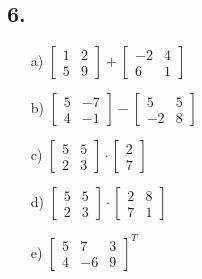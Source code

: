 \documentclass{article}
\begin{document}
\subsection*{6.}
\begin{itemize}
    \item[a) ]	
    			$ 
    			\begin{bmatrix}
    			1 & 2 \\
    			5 & 9
    			\end{bmatrix}
    			+
    			\begin{bmatrix}
    			-2 & 4 \\
    			6  & 1
    			\end{bmatrix}
    			$
    \item[b) ]	
    			$ 
    			\begin{bmatrix}
    			5 & -7 \\
    			4 & -1
    			\end{bmatrix}
    			-
    			\begin{bmatrix}
    			5   & 5 \\
    			-2  & 8
    			\end{bmatrix}
    			$
    			
    \item[c) ]	
    			$ 
    			\begin{bmatrix}
    			5  & 5 \\
    			2  & 3
    			\end{bmatrix}
    			\cdot
    			\begin{bmatrix}
    			2   \\
    			7  
    			\end{bmatrix}
    			$
    			
    \item[d) ]	
    			$ 
    			\begin{bmatrix}
    			5  & 5 \\
    			2  & 3
    			\end{bmatrix}
    			\cdot
    			\begin{bmatrix}
    			2 & 8  \\
    			7 & 1
    			\end{bmatrix}
    			$
    \item[e) ]	
    			$ 
    			\begin{bmatrix}
    			5 & 7  & 3 \\
    			4 & -6 & 9
    			\end{bmatrix}
    			^{T}
    			$
    		
\end{itemize}
\end{document}
